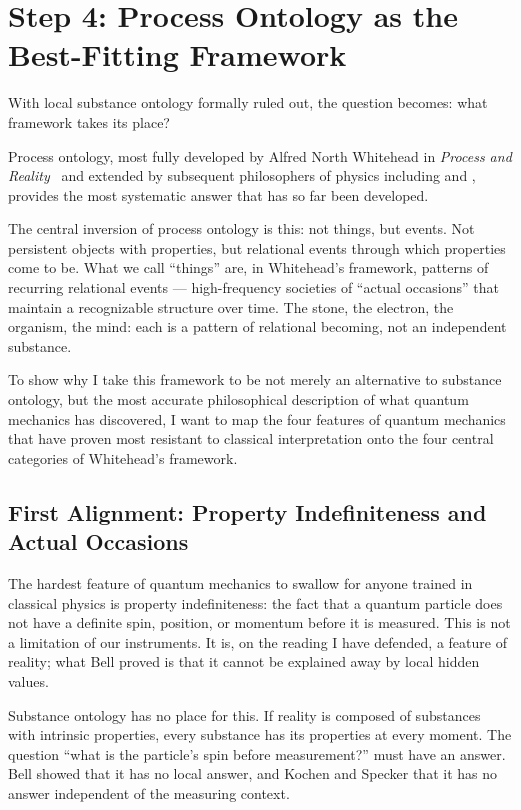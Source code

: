 \section{Step 4: Process Ontology as the Best-Fitting Framework}
\label{sec:ch5-step4}

With local substance ontology formally ruled out, the question becomes: what
framework takes its place?

Process ontology, most fully developed by Alfred North Whitehead in
\textit{Process and Reality}~\citep{Whitehead1929} and extended by subsequent
philosophers of physics including \citet{Epperson2004} and
\citet{Stapp2007}, provides the most systematic answer that has so far
been developed.

The central inversion of process ontology is this: not things, but events.
Not persistent objects with properties, but relational events through which
properties come to be.
What we call ``things'' are, in Whitehead's framework, patterns of recurring
relational events --- high-frequency societies of ``actual occasions'' that
maintain a recognizable structure over time.
The stone, the electron, the organism, the mind: each is a pattern of relational
becoming, not an independent substance.

To show why I take this framework to be not merely an alternative to substance
ontology, but the most accurate philosophical description of what quantum
mechanics has discovered, I want to map the four features of quantum mechanics
that have proven most resistant to classical interpretation onto the four central
categories of Whitehead's framework.

\subsection*{First Alignment: Property Indefiniteness and Actual Occasions}

The hardest feature of quantum mechanics to swallow for anyone trained in classical
physics is property indefiniteness: the fact that a quantum particle does not have
a definite spin, position, or momentum before it is measured.
This is not a limitation of our instruments.
It is, on the reading I have defended, a feature of reality; what Bell proved is
that it cannot be explained away by local hidden values.

Substance ontology has no place for this.
If reality is composed of substances with intrinsic properties, every substance
has its properties at every moment.
The question ``what is the particle's spin before measurement?'' must have an
answer.
Bell showed that it has no local answer, and Kochen and Specker that it has no
answer independent of the measuring context.


